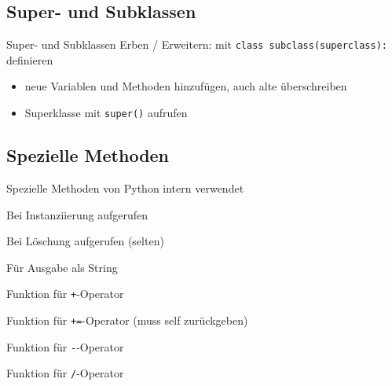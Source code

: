 \subsection{Super- und Subklassen}
\begin{frame}{Super- und Subklassen}
	Erben / Erweitern: mit \alert{\tt class subclass(superclass):} definieren
	\begin{itemize}
		\item neue Variablen und Methoden hinzufügen, auch alte überschreiben
		\item Superklasse mit \alert{\tt super()} aufrufen
	\end{itemize}
\end{frame}
\subsection{Spezielle Methoden}
\begin{frame}{Spezielle Methoden}
	von Python intern verwendet

	\begin{description}
		\item<1->[\tt\_\_init\_\_] Bei Instanziierung aufgerufen
		\item<2->[\tt\_\_del\_\_] Bei Löschung aufgerufen (selten)
		\item<3->[\tt\_\_str\_\_] Für Ausgabe als String
		\item<4->[\tt\_\_add\_\_] Funktion für \alert{\tt +}-Operator
		\item<5->[\tt\_\_iadd\_\_] Funktion für \alert{\tt +=}-Operator (muss self zurückgeben)
		\item<6->[\tt\_\_sub\_\_] Funktion für \alert{\tt -}-Operator
		\item<7->[\tt\_\_truediv\_\_] Funktion für \alert{\tt /}-Operator
	\end{description}
\end{frame}



